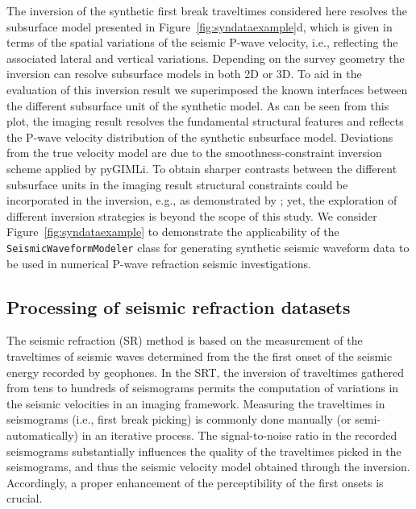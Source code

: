 \documentclass[a4paper,fleqn]{cas-sc}
\begin{document}
The inversion of the synthetic first break traveltimes considered here resolves the subsurface model presented in Figure~\ref{fig:syndataexample}d, which is given in terms of the spatial variations of the seismic P-wave velocity, i.e., reflecting the associated lateral and vertical variations. Depending on the survey geometry the inversion can resolve subsurface models in both 2D or 3D. 
To aid in the evaluation of this inversion result we superimposed the known interfaces between the different subsurface unit of the synthetic model. As can be seen from this plot, the imaging result resolves the fundamental structural features  and reflects the P-wave velocity distribution of the synthetic subsurface model. Deviations from the true velocity model are due to the smoothness-constraint inversion scheme applied by pyGIMLi. To obtain sharper contrasts between the different subsurface units in the imaging result structural constraints could be incorporated in the inversion, e.g., as demonstrated by \citep{steiner2021}; yet, the exploration of different inversion strategies is beyond the scope of this study. We consider Figure~\ref{fig:syndataexample} to demonstrate the applicability of the \texttt{SeismicWaveformModeler} class for generating synthetic seismic waveform data to be used in numerical P-wave refraction seismic investigations.

\subsection{Processing of seismic refraction datasets}

The seismic refraction (SR) method is based on the measurement of the traveltimes of seismic waves determined from the the first onset of the seismic energy recorded by geophones. In the SRT, the inversion of traveltimes gathered from tens to hundreds of seismograms permits the computation of variations in the seismic velocities in an imaging framework. Measuring the traveltimes in seismograms (i.e., first break picking) is commonly done manually (or semi-automatically) in an iterative process. The signal-to-noise ratio in the recorded seismograms substantially influences the quality of the traveltimes picked in the seismograms, and thus the seismic velocity model obtained through the inversion. Accordingly, a proper enhancement of the perceptibility of the first onsets is crucial.
\end{document}
